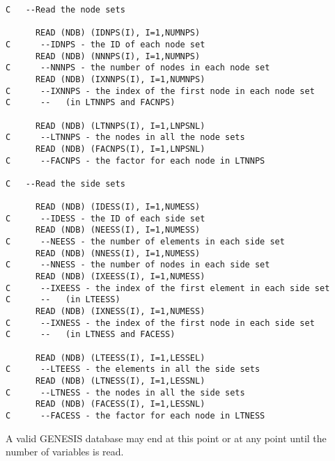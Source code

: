 \newpage
\begin{verbatim}
C   --Read the node sets

      READ (NDB) (IDNPS(I), I=1,NUMNPS)
C      --IDNPS - the ID of each node set
      READ (NDB) (NNNPS(I), I=1,NUMNPS)
C      --NNNPS - the number of nodes in each node set
      READ (NDB) (IXNNPS(I), I=1,NUMNPS)
C      --IXNNPS - the index of the first node in each node set
C      --   (in LTNNPS and FACNPS)

      READ (NDB) (LTNNPS(I), I=1,LNPSNL)
C      --LTNNPS - the nodes in all the node sets
      READ (NDB) (FACNPS(I), I=1,LNPSNL)
C      --FACNPS - the factor for each node in LTNNPS

C   --Read the side sets

      READ (NDB) (IDESS(I), I=1,NUMESS)
C      --IDESS - the ID of each side set
      READ (NDB) (NEESS(I), I=1,NUMESS)
C      --NEESS - the number of elements in each side set
      READ (NDB) (NNESS(I), I=1,NUMESS)
C      --NNESS - the number of nodes in each side set
      READ (NDB) (IXEESS(I), I=1,NUMESS)
C      --IXEESS - the index of the first element in each side set
C      --   (in LTEESS)
      READ (NDB) (IXNESS(I), I=1,NUMESS)
C      --IXNESS - the index of the first node in each side set
C      --   (in LTNESS and FACESS)

      READ (NDB) (LTEESS(I), I=1,LESSEL)
C      --LTEESS - the elements in all the side sets
      READ (NDB) (LTNESS(I), I=1,LESSNL)
C      --LTNESS - the nodes in all the side sets
      READ (NDB) (FACESS(I), I=1,LESSNL)
C      --FACESS - the factor for each node in LTNESS
\end{verbatim}
\newpage

A valid GENESIS database may end at this point or at any point until the
number of variables is read.

